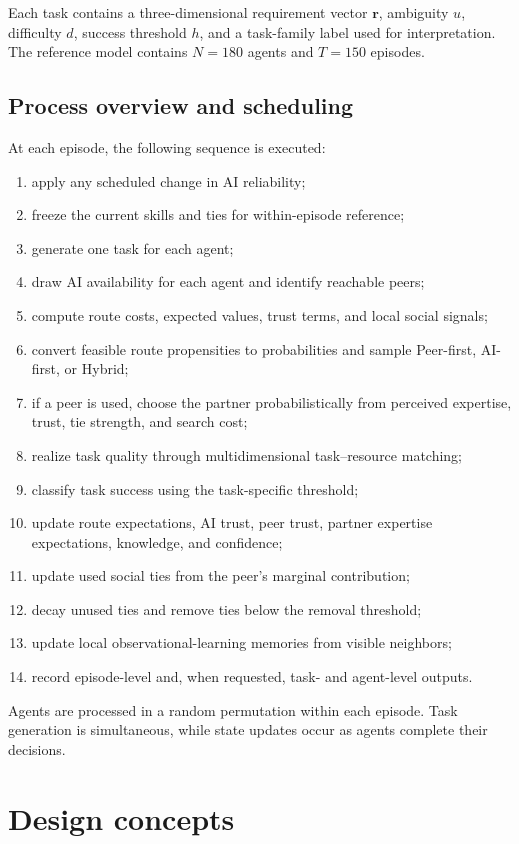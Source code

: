 \documentclass[11pt]{article}
\begin{document}
Each task contains a three-dimensional requirement vector $\mathbf{r}$, ambiguity $u$, difficulty $d$, success threshold $h$, and a task-family label used for interpretation. The reference model contains $N=180$ agents and $T=150$ episodes.

\subsection{Process overview and scheduling}
At each episode, the following sequence is executed:
\begin{enumerate}
\item apply any scheduled change in AI reliability;
\item freeze the current skills and ties for within-episode reference;
\item generate one task for each agent;
\item draw AI availability for each agent and identify reachable peers;
\item compute route costs, expected values, trust terms, and local social signals;
\item convert feasible route propensities to probabilities and sample Peer-first, AI-first, or Hybrid;
\item if a peer is used, choose the partner probabilistically from perceived expertise, trust, tie strength, and search cost;
\item realize task quality through multidimensional task--resource matching;
\item classify task success using the task-specific threshold;
\item update route expectations, AI trust, peer trust, partner expertise expectations, knowledge, and confidence;
\item update used social ties from the peer's marginal contribution;
\item decay unused ties and remove ties below the removal threshold;
\item update local observational-learning memories from visible neighbors;
\item record episode-level and, when requested, task- and agent-level outputs.
\end{enumerate}
Agents are processed in a random permutation within each episode. Task generation is simultaneous, while state updates occur as agents complete their decisions.

\section{Design concepts}
\end{document}

